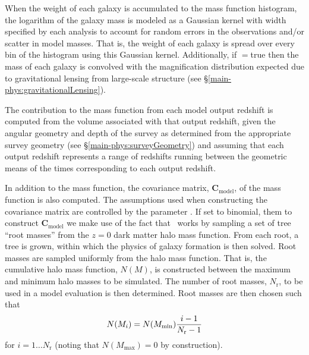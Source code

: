 When the weight of each galaxy is accumulated to the mass function histogram, the logarithm of the galaxy mass is modeled as a Gaussian kernel with width specified by each analysis to account for random errors in the observations and/or scatter in model masses. That is, the weight of each galaxy is spread over every bin of the histogram using this Gaussian kernel. Additionally, if {\normalfont \ttfamily [analysisMassFunctionsApplyGravitationalLensing]}$=${\normalfont \ttfamily true} then the mass of each galaxy is convolved with the magnification distribution expected due to gravitational lensing from large-scale structure (see \S\ref{main-phys:gravitationalLensing}).

The contribution to the mass function from each model output redshift is computed from the volume associated with that output redshift, given the angular geometry and depth of the survey as determined from the appropriate survey geometry (see \S\ref{main-phys:surveyGeometry}) and assuming that each output redshift represents a range of redshifts running between the geometric means of the times corresponding to each output redshift. 

In addition to the mass function, the covariance matrix, $\mathbf{C}_\mathrm{model}$, of the mass function is also computed. The assumptions used when constructing the covariance matrix are controlled by the parameter {\normalfont \ttfamily [analysisMassFunctionCovarianceModel]}. If set to {\normalfont \ttfamily binomial}, them to construct $\mathbf{C}_\mathrm{model}$ we make use of the fact that \glc\ works by sampling a set of tree ``root masses'' from the $z=0$ dark matter halo mass function. From each root, a tree is grown, within which the physics of galaxy formation is then solved. Root masses are sampled uniformly from the halo mass function. That is, the cumulative halo mass function, $N(M)$, is constructed between the maximum and minimum halo masses to be simulated. The number of root masses, $N_\mathrm{r}$, to be used in a model evaluation is then determined. Root masses are then chosen such that
\begin{equation}
 N(M_i) = N(M_\mathrm{min}) {i-1 \over N_\mathrm{r}-1}
\end{equation}
for $i=1\ldots N_\mathrm{r}$ (noting that $N(M_\mathrm{max})=0$ by construction). 

